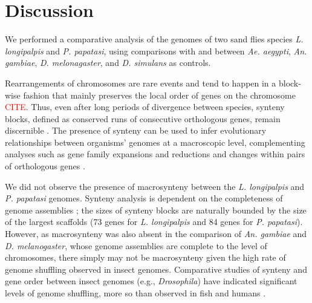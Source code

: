 \section{Discussion}
We performed a comparative analysis of the genomes of two sand flies species \emph{L. longipalpis} and \emph{P. papatasi}, using comparisons with and between \emph{Ae. aegypti}, \emph{An. gambiae}, \emph{D. melonagaster}, and \emph{D. simulans} as controls.


Rearrangements of chromosomes are rare events and tend to happen in a block-wise fashion that mainly preserves the local order of genes on the chromosome \textcolor{red}{CITE}. Thus, even after long periods of divergence between species, synteny blocks, defined as conserved runs of consecutive orthologous genes, remain discernible \cite{Heger2007}.  The presence of synteny can be used to infer evolutionary relationships between organisms' genomes at a macroscopic level, complementing analyses such as gene family expansions and reductions and changes within pairs of orthologous genes \cite{Zdobnov2002,Zdobnov2007}.

We did not observe the presence of macrosynteny between the \emph{L. longipalpis} and \emph{P. papatasi} genomes.  Synteny analysis is dependent on the completeness of genome assemblies \cite{Heger2007}; the sizes of synteny blocks are naturally bounded by the size of the largest scaffolds (73 genes for \emph{L. longipalpis} and 84 genes for \emph{P. papatasi}).  However, as macrosynteny was also absent in the comparison of \emph{An. gambiae} and \emph{D. melanogaster}, whose genome assemblies are complete to the level of chromosomes, there simply may not be macrosynteny given the high rate of genome shuffling observed in insect genomes. Comparative studies of synteny and gene order between insect genomes (e.g., \emph{Drosophila}) have indicated significant levels of genome shuffling, more so than observed in fish and humans \cite{Ranz2001,Zdobnov2002,Zdobnov2007}.

